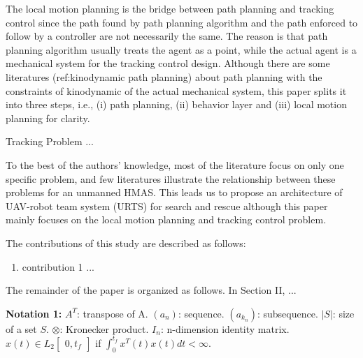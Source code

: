 \documentclass{ieeeaccess}
\begin{document}
The local motion planning is the bridge between path planning and tracking control since the path found by path planning algorithm and the path enforced to follow by a controller are not necessarily the same. The reason is that path planning algorithm usually treats the agent as a point, while the actual agent is a mechanical system for the tracking control design. Although there are some literatures (ref:kinodynamic path planning) about path planning with the constraints of kinodynamic of the actual mechanical system, this paper splits it into three steps, i.e., (i) path planning, (ii) behavior layer and (iii) local motion planning for clarity.

Tracking Problem ...

To the best of the authors' knowledge, most of the literature focus on only one specific problem, and few literatures illustrate the relationship between these problems for an unmanned HMAS. This leads us to propose an architecture of UAV-robot team system (URTS) for search and rescue although this paper mainly focuses on the local motion planning and tracking control problem.


The contributions of this study are described as follows:
\begin{enumerate}
    \item contribution 1 ...
\end{enumerate}

The remainder of the paper is organized as follows. In Section II, ...

\textbf{Notation 1:} 
$A^T$: transpose of A. $(a_n)$: sequence. $(a_{k_n})$: subsequence. $\vert{S}\vert$: size of a set $S$. $\otimes$: Kronecker product. $I_n$: n-dimension identity matrix. $x(t)\in L_2\begin{bmatrix}
    0,t_f 
\end{bmatrix}$ if $\int^{t_f}_{0}x^T(t)x(t)dt<\infty$.
\end{document}
